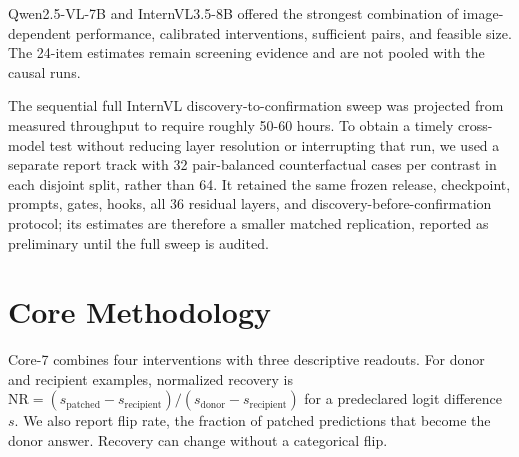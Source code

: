 \documentclass[11pt]{article}
\newcommand{\nr}{\mathrm{NR}}
\begin{document}
Qwen2.5-VL-7B and InternVL3.5-8B offered the strongest combination of
image-dependent performance, calibrated interventions, sufficient pairs, and
feasible size. The 24-item estimates remain screening evidence and are not
pooled with the causal runs.

The sequential full InternVL discovery-to-confirmation sweep was projected
from measured throughput to require roughly 50-60 hours. To obtain a timely
cross-model test without reducing layer resolution or interrupting that run,
we used a separate report track with 32 pair-balanced counterfactual cases per
contrast in each disjoint split, rather than 64. It retained the same frozen
release, checkpoint, prompts, gates, hooks, all 36 residual layers, and
discovery-before-confirmation protocol; its estimates are therefore a smaller
matched replication, reported as preliminary until the full sweep is audited.

\section{Core Methodology}

Core-7 combines four interventions with three descriptive readouts. For donor
and recipient examples, normalized recovery is
$\nr=(s_{\mathrm{patched}}-s_{\mathrm{recipient}})/
(s_{\mathrm{donor}}-s_{\mathrm{recipient}})$ for a predeclared logit
difference $s$. We also report flip rate, the fraction of patched predictions
that become the donor answer. Recovery can change without a categorical flip.
\end{document}
